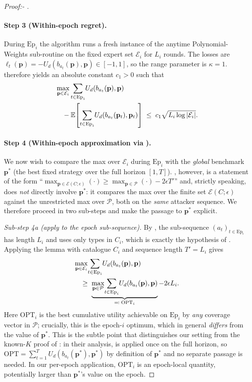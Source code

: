 \documentclass[letterpaper,9pt,twocolumn]{extarticle}
\newcommand{\pvec}{\mathbf{p}}
\newcommand{\cP}{\mathcal{P}}
\newcommand{\cE}{\mathcal{E}}
\newcommand{\EE}{\mathbb{E}}
\theoremstyle{plain}
\theoremstyle{definition}
\theoremstyle{remark}
\begin{document}
\begin{proof}[Proof:- ]
\paragraph{Step 3 (Within-epoch regret).}
During $\mathrm{Ep}_i$ the algorithm runs a fresh instance of the anytime
Polynomial-Weights sub-routine on the fixed expert set $\cE_i$ for $L_i$
rounds. The losses are $\ell_t(\pvec)=-U_d(b_{a_t}(\pvec),\pvec)\in[-1,1]$,
so the range parameter is $\kappa=1$.  therefore
yields an absolute constant $c_1>0$ such that
\begin{align}
&\max_{\pvec\in\cE_i}\sum_{t\in\mathrm{Ep}_i}\!U_d(b_{a_t}(\pvec),\pvec)\notag\\
&\quad-\EE\!\left[\sum_{t\in\mathrm{Ep}_i}\!U_d(b_{a_t}(\pvec_t),\pvec_t)\right]\;\le\;c_1\sqrt{L_i\log|\cE_i|}.
\label{eq:hedge-epoch}
\end{align}

\paragraph{Step 4 (Within-epoch approximation via ).}
We now wish to compare the max over $\cE_i$ during $\mathrm{Ep}_i$ with
the \emph{global} benchmark $\pvec^{*}$ (the best fixed strategy over the
full horizon $[1,T]$). , however, is a statement of the form
``$\max_{\pvec\in\cE(C;\epsilon)}(\cdot)\ge\max_{\pvec\in\cP}(\cdot)-2\epsilon T'$''
and, strictly speaking, does \emph{not} directly involve $\pvec^{*}$: it
compares the max over the finite set $\cE(C;\epsilon)$ against the
unrestricted max over $\cP$, both on the \emph{same} attacker sequence.
We therefore proceed in two sub-steps and make the passage to $\pvec^{*}$
explicit.

\emph{Sub-step 4a (apply  to the epoch sub-sequence).}
By , the sub-sequence $(a_t)_{t\in\mathrm{Ep}_i}$
has length $L_i$ and uses only types in $C_i$, which is exactly the
hypothesis of . Applying the lemma with catalogue $C_i$ and
sequence length $T'=L_i$ gives
\begin{align}
&\max_{\pvec\in\cE_i}\!\sum_{t\in\mathrm{Ep}_i}\!U_d(b_{a_t}(\pvec),\pvec)\notag\\
&\quad\ge\;\underbrace{\max_{\pvec\in\cP}\!\sum_{t\in\mathrm{Ep}_i}\!U_d(b_{a_t}(\pvec),\pvec)}_{\eqqcolon\;\mathrm{OPT}_i}-2\epsilon L_i.
\label{eq:lem43-epoch}
\end{align}
Here $\mathrm{OPT}_i$ is the best cumulative utility achievable on
$\mathrm{Ep}_i$ by \emph{any} coverage vector in $\cP$; crucially, this
is the epoch-$i$ optimum, which in general \emph{differs} from the value
of $\pvec^{*}$. This is the subtle point that distinguishes
our setting from the known-$K$ proof of \citet[Sec.~5]{balcan2015}: in their
analysis,  is applied once on the full horizon, so
$\mathrm{OPT}=\sum_{t=1}^T U_d(b_{a_t}(\pvec^{*}),\pvec^{*})$ by
definition of $\pvec^{*}$ and no separate passage is needed. In our
per-epoch application, $\mathrm{OPT}_i$ is an epoch-local quantity,
potentially larger than $\pvec^{*}$'s value on the epoch.


\end{proof}
\end{document}

